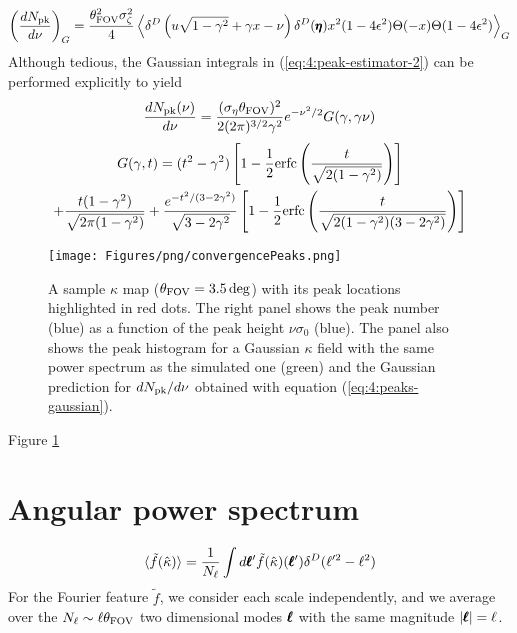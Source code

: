 \begin{equation}
\label{eq:4:peak-estimator-2}
\left(\frac{dN_{\rm pk}}{d\nu}\right)_G = \frac{\theta^2_{\rm FOV}\sigma^2_\zeta}{4}\left\langle\delta^D\left(u\sqrt{1-\gamma^2}+\gamma x-\nu\right)\delta^D(\pmb{\eta})x^2(1-4\epsilon^2)\Theta(-x)\Theta(1-4\epsilon^2)\right\rangle_G
\end{equation}
%
Although tedious, the Gaussian integrals in (\ref{eq:4:peak-estimator-2}) can be performed explicitly \citep{BondCMB} to yield
%
\begin{equation}
\label{eq:4:peaks-gaussian}
\frac{dN_{\rm pk}(\nu)}{d\nu} = \frac{(\sigma_\eta\theta_{\rm FOV})^2}{2(2\pi)^{3/2} \gamma^2}e^{-\nu^2/2}G(\gamma,\gamma\nu)
\end{equation}
%
\begin{equation}
\label{eq:4:Gdef}
\begin{gathered}
G(\gamma,t) = (t^2-\gamma^2)\left[1-\frac{1}{2}{\rm erfc}\left(\frac{t}{\sqrt{2(1-\gamma^2)}}\right)\right] \\
+ \frac{t(1-\gamma^2)}{\sqrt{2\pi(1-\gamma^2)}} + \frac{e^{-t^2/(3-2\gamma^2)}}{\sqrt{3-2\gamma^2}}\left[1-\frac{1}{2}{\rm erfc}\left(\frac{t}{\sqrt{2(1-\gamma^2)(3-2\gamma^2)}}\right)\right]
\end{gathered}
\end{equation}
%
\begin{figure}
\begin{center}
\texttt{[image: Figures/png/convergencePeaks.png]}
\end{center}
\caption{A sample $\kappa$ map ($\theta_{\rm FOV}=3.5\,{\rm deg}$) with its peak locations highlighted in red dots. The right panel shows the peak number (blue) as a function of the peak height $\nu\sigma_0$ (blue). The panel also shows the peak histogram for a Gaussian $\kappa$ field with the same power spectrum as the simulated one (green) and the Gaussian prediction for $dN_{\rm pk}/d\nu$ obtained with equation (\ref{eq:4:peaks-gaussian}).}
\label{fig:4:peaks}
\end{figure}
%
Figure \ref{fig:4:peaks}


\section{Angular power spectrum}

\begin{equation}
\label{eq:4:average-fourier}
\langle \tilde{f}(\hat{\kappa})\rangle = \frac{1}{N_{\ell}}\int d\pmb{\ell}' \tilde{f}(\hat{\kappa})(\pmb{\ell}')\delta^D(\ell'^2-\ell^2)
\end{equation}  
%
For the Fourier feature $\tilde{f}$, we consider each scale independently, and we average over the $N_\ell\sim\ell\theta_{\rm FOV}$ two dimensional modes $\pmb{\ell}$ with the same magnitude $\vert\pmb{\ell}\vert=\ell$.

